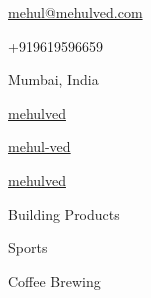 \documentclass[11pt]{spidercv}
\begin{document}
    \begin{TopBar}{\ColorTextSide}

        \begin{DoubleColumns}
            \begin{ItemList}{\ColorHighlight}
                \item [\Large\faAt] \href{mailto:mehul@mehulved.com}{mehul@mehulved.com}
                \item [\Large\faMobile] +919619596659
                \item [\Large\faMapMarker] Mumbai, India
            \end{ItemList}
            \nextcolumn
            \begin{ItemList}{\ColorHighlight}
                \item [\Large\faGithub] \href{https://github.com/mehulved}{mehulved}
                \item [\Large\faLinkedinSquare] \href{https://www.linkedin.com/mehul-ved}{mehul-ved}
                \item[\Large\faTwitter] \href{https://twitter.com/mehulved}{mehulved}
            \end{ItemList}
        \end{DoubleColumns}

        \begin{TripleColumns}
            \begin{ItemList}{\ColorHighlight}
                \item [] Building Products
            \end{ItemList}
            \nextcolumn
            \begin{ItemList}{\ColorHighlight}
                \item [] Sports
            \end{ItemList}
            \nextcolumn
            \begin{ItemList}{\ColorHighlight}
                \item [] Coffee Brewing
            \end{ItemList}
        \end{TripleColumns}
    \end{TopBar}
\end{document}
